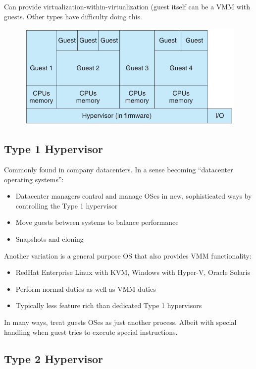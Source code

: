 Can provide virtualization-within-virtualization (guest itself can be a
VMM with guests. Other types have difficulty doing this.


\begin{figure}[h!]
    \centering
    \includegraphics[width=0.5\linewidth]{img/dvsvdsadv.png}
\end{figure}

\subsection{Type 1 Hypervisor}
Commonly found in company datacenters. In a sense becoming “datacenter operating systems”:

\begin{itemize}
    \item Datacenter managers control and manage OSes in new, sophisticated ways by controlling the Type 1 hypervisor
    \item Move guests between systems to balance performance
    \item Snapshots and cloning
\end{itemize}

Another variation is a general purpose OS that also provides VMM functionality:

\begin{itemize}
    \item [] RedHat Enterprise Linux with KVM, Windows with Hyper-V, Oracle Solaris
    \item [] Perform normal duties as well as VMM duties
    \item [] Typically less feature rich than dedicated Type 1 hypervisors
\end{itemize}



In many ways, treat guests OSes as just another process. Albeit with special handling when guest tries to execute special
instructions.


\subsection{Type 2 Hypervisor}

